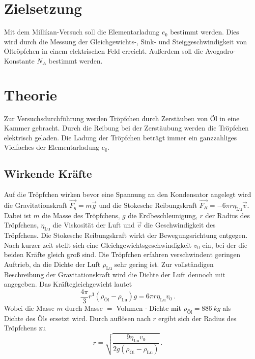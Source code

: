 \section{Zielsetzung}
\label{sec:Zielsetzung}

Mit dem Millikan-Versuch soll die Elementarladung $e_0$ bestimmt werden.
Dies wird durch die Messung der Gleichgewichts-, Sink- und Steiggeschwindigkeit von Öltröpfchen in einem elektrischen Feld erreicht.
Außerdem soll die Avogadro-Konstante $N_A$ bestimmt werden.

\section{Theorie}
\label{sec:Theorie}

Zur Versuchsdurchführung werden Tröpfchen durch Zerstäuben von Öl in eine Kammer gebracht.
Durch die Reibung bei der Zerstäubung werden die Tröpfchen elektrisch geladen.
Die Ladung der Tröpfchen beträgt immer ein ganzzahliges Vielfaches der Elementarladung $e_0$.

\subsection{Wirkende Kräfte}%
\label{sec:Wirkende Kräfte}

Auf die Tröpfchen wirken bevor eine Spannung an den Kondensator angelegt wird die Gravitationskraft $\vec{F_g} = m \vec{g}$ und die Stokesche Reibungskraft $\vec{F_R} = -6\pi r \eta_{\text{Lu}} \vec{v}$.
Dabei ist $m$ die Masse des Tröpfchens, $g$ die Erdbeschleunigung, $r$ der Radius des Tröpfchens, $\eta_{\text{Lu}}$ die Viskosität der Luft und $\vec{v}$ die Geschwindigkeit des Tröpfchens.
Die Stokesche Reibungskraft wirkt der Bewegungsrichtung entgegen.
Nach kurzer zeit stellt sich eine Gleichgewichtsgeschwindigkeit $v_0$ ein, bei der die beiden Kräfte gleich groß sind.
Die Tröpfchen erfahren verschwindent geringen Auftrieb, da die Dichte der Luft $\rho_{\text{Lu}}$ sehr gering ist.
Zur vollständigen Beschreibung der Gravitationskraft wird die Dichte der Luft dennoch mit angegeben.
Das Kräftegleichgewicht lautet
\begin{equation*}
    \frac{4 \pi}{3}r^3 \left(\rho_{\text{Öl}} - \rho_{\text{Lu}}\right) g = 6 \pi r \eta_{\text{Lu}} v_0 \, .
\end{equation*}
Wobei die Masse $m$ durch Masse $=$ Volumen $\cdot$ Dichte mit $\rho_{\text{Öl}} = \SI{886}{kg}$ als Dichte des Öls ersetzt wird. 
Durch auflösen nach $r$ ergibt sich der Radius des Tröpfchens zu
\begin{equation*}
    r = \sqrt{\frac{9 \eta_{\text{Lu}} v_0}{2 g \left(\rho_{\text{Öl}} - \rho_{\text{Lu}}\right)}} \, .
\end{equation*}

